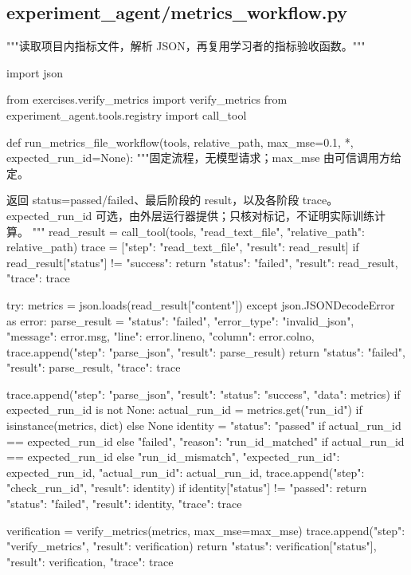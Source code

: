 \documentclass[UTF8,zihao=-4,fontset=fandol]{ctexart}
\begin{document}
\subsection{experiment\_agent/metrics\_workflow.py}

\begin{Code}
"""读取项目内指标文件，解析 JSON，再复用学习者的指标验收函数。"""

import json

from exercises.verify_metrics import verify_metrics
from experiment_agent.tools.registry import call_tool


def run_metrics_file_workflow(tools, relative_path, max_mse=0.1, *, expected_run_id=None):
    """固定流程，无模型请求；max_mse 由可信调用方给定。

    返回 status=passed/failed、最后阶段的 result，以及各阶段 trace。
    expected_run_id 可选，由外层运行器提供；只核对标记，不证明实际训练计算。
    """
    read_result = call_tool(tools, "read_text_file", {"relative_path": relative_path})
    trace = [{"step": "read_text_file", "result": read_result}]
    if read_result["status"] != "success":
        return {"status": "failed", "result": read_result, "trace": trace}

    try:
        metrics = json.loads(read_result["content"])
    except json.JSONDecodeError as error:
        parse_result = {
            "status": "failed",
            "error_type": "invalid_json",
            "message": error.msg,
            "line": error.lineno,
            "column": error.colno,
        }
        trace.append({"step": "parse_json", "result": parse_result})
        return {"status": "failed", "result": parse_result, "trace": trace}

    trace.append({"step": "parse_json", "result": {"status": "success", "data": metrics}})
    if expected_run_id is not None:
        actual_run_id = metrics.get("run_id") if isinstance(metrics, dict) else None
        identity = {
            "status": "passed" if actual_run_id == expected_run_id else "failed",
            "reason": "run_id_matched" if actual_run_id == expected_run_id else "run_id_mismatch",
            "expected_run_id": expected_run_id,
            "actual_run_id": actual_run_id,
        }
        trace.append({"step": "check_run_id", "result": identity})
        if identity["status"] != "passed":
            return {"status": "failed", "result": identity, "trace": trace}

    verification = verify_metrics(metrics, max_mse=max_mse)
    trace.append({"step": "verify_metrics", "result": verification})
    return {"status": verification["status"], "result": verification, "trace": trace}
\end{Code}
\end{document}
